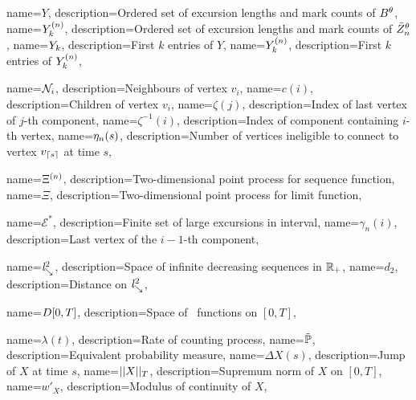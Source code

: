 {
name={$Y$},
description={Ordered set of excursion lengths and mark counts of $B^{\theta}$, \pageref{E: def Y}}
}
{
name={${Y}^{(n)}_k$},
description={Ordered set of excursion lengths and mark counts of $\bar{Z}^{\theta}_n$, \pageref{E: def Yn}}
}
{
name={${Y}_k$},
description={First $k$ entries of $Y$, \pageref{E: def Yk Ynk}}
}
{
name={${Y}^{(n)}_k$},
description={First $k$ entries of ${Y}^{(n)}_k$, \pageref{E: def Yk Ynk}}
}


{
	name={$\mathcal{N}_{i}$},
	description={Neighbours of vertex $v_i$, \pageref{D: Ni}}
}
{
name={$c(i)$},
description={Children of vertex $v_i$, \pageref{D: ci}}
}
{
name={$\zeta(j)$},
description={Index of last vertex of $j$-th component, \pageref{E: zeta}}
}
{
name={$\zeta^{-1}(i)$},
description={Index of component containing $i$-th vertex, \pageref{E: zeta}}
}
{
	name={$\eta_n(s)$},
	description={Number of vertices ineligible to connect to vertex $v_{\lceil s\rceil}$ at time $s$, \pageref{I: eta}}
}

{
	name={$\Xi^{(n)}$},
	description={Two-dimensional point process for sequence function, \pageref{L: Deterministic Lemma}}
}
{
name={$\Xi$},
description={Two-dimensional point process for limit function, \pageref{L: Deterministic Lemma}}
}

{
	name={$\mathcal{E}^*$},
	description={Finite set of large excursions in interval, \pageref{L: Deterministic Lemma}}
}
{
name={$\gamma_n(i)$},
description={Last vertex of the $i-1$-th component, \pageref{L: Lemma 8}}
}


{
	name={$\mathit{l}^2_{\searrow}$},
	description={Space of infinite decreasing sequences in $\mathbb{R}_+$, \pageref{D: ld}}
}
{
	name={$d_2$},
	description={Distance on $\mathit{l}^2_{\searrow}$, \pageref{D: ld}}
}

{
name={$D[0, T]$},
description={Space of \cadlag~functions on $[0,T]$, \pageref{D: DT}}
}

{
name={$\lambda(t)$},
description={Rate of counting process, \pageref{D: def gamma(A)}}
}
{
name={$\tilde{\mathbb{P}}$},
description={Equivalent probability measure, \pageref{T: Girsanov}}
}
{
name={$\Delta X(s)$},
description={Jump of $X$ at time $s$, \pageref{I: DeltaX}}
}
{
name={$||X||_T$},
description={Supremum norm of $X$ on $[0,T]$, \pageref{I: supnorm}}
}
{
	name={$w'_X$},
	description={Modulus of continuity of $X$, \pageref{D: modulus of continuity}}
}

